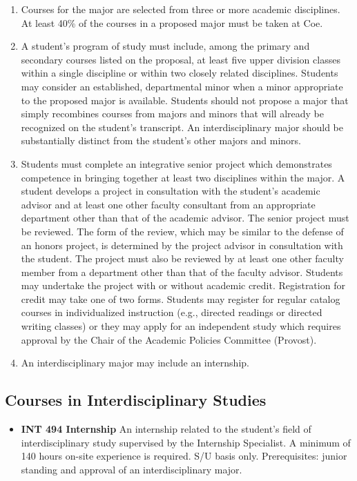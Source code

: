\documentclass[
  letterpaper,
]{scrbook}
\providecommand{\tightlist}{%
  \setlength{\itemsep}{0pt}\setlength{\parskip}{0pt}}
\begin{document}
\begin{enumerate}
\def\labelenumi{\arabic{enumi}.}
\tightlist
\item
  Courses for the major are selected from three or more academic
  disciplines. At least 40\% of the courses in a proposed major must be
  taken at Coe.
\item
  A student's program of study must include, among the primary and
  secondary courses listed on the proposal, at least five upper division
  classes within a single discipline or within two closely related
  disciplines. Students may consider an established, departmental minor
  when a minor appropriate to the proposed major is available. Students
  should not propose a major that simply recombines courses from majors
  and minors that will already be recognized on the student's
  transcript. An interdisciplinary major should be substantially
  distinct from the student's other majors and minors.
\item
  Students must complete an integrative senior project which
  demonstrates competence in bringing together at least two disciplines
  within the major. A student develops a project in consultation with
  the student's academic advisor and at least one other faculty
  consultant from an appropriate department other than that of the
  academic advisor. The senior project must be reviewed. The form of the
  review, which may be similar to the defense of an honors project, is
  determined by the project advisor in consultation with the student.
  The project must also be reviewed by at least one other faculty member
  from a department other than that of the faculty advisor. Students may
  undertake the project with or without academic credit. Registration
  for credit may take one of two forms. Students may register for
  regular catalog courses in individualized instruction (e.g., directed
  readings or directed writing classes) or they may apply for an
  independent study which requires approval by the Chair of the Academic
  Policies Committee (Provost).
\item
  An interdisciplinary major may include an internship.
\end{enumerate}

\subsection{Courses in Interdisciplinary
Studies}\label{courses-in-interdisciplinary-studies}

\begin{itemize}
\tightlist
\item
  \textbf{INT 494 Internship} An internship related to the student's
  field of interdisciplinary study supervised by the Internship
  Specialist. A minimum of 140 hours on-site experience is required. S/U
  basis only. Prerequisites: junior standing and approval of an
  interdisciplinary major.
\end{itemize}
\end{document}

